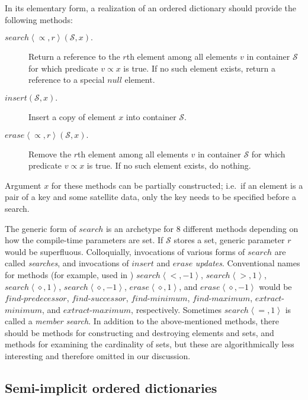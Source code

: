 \documentclass{DIKU-article}
\newcommand{\Search}{\mbox{$\mathit{search}$}}
\newcommand{\sequence}[1]{\left\langle#1\right\rangle}
\newcommand{\Erase}{\mbox{$\mathit{erase}$}}
\newcommand{\Findmin}{\mbox{$\mathit{find}$\textnormal{-}}\allowbreak{}\mbox{$\mathit{minimum}$}}
\newcommand{\Findmax}{\mbox{$\mathit{find}$\textnormal{-}}\allowbreak{}\mbox{$\mathit{maximum}$}}
\newcommand{\Predecessor}{\mbox{$\mathit{find}$\textnormal{-}}\allowbreak{}\mbox{$\mathit{predecessor}$}}
\newcommand{\Successor}{\mbox{$\mathit{find}$\textnormal{-}}\allowbreak{}\mbox{$\mathit{successor}$}}
\newcommand{\Insert}{\mbox{$\mathit{insert}$}}
\newcommand{\Extractmin}{\mbox{$\mathit{extract}$\textnormal{-}$\mathit{minimum}$}}
\newcommand{\Extractmax}{\mbox{$\mathit{extract}$\textnormal{-}$\mathit{maximum}$}}
\newcommand{\Null}{\mbox{$\mathit{null}$}}
\begin{document}
In its elementary form, a realization of an ordered dictionary should
provide the following methods:
\begin{description}

\item[$\Search\sequence{\propto,\mathit{r}}(\mathcal{S}, x).$] Return
a reference to the $r$th element among all elements $v$ in container
$\mathcal{S}$ for which predicate $v \propto x$ is true.  If no such
element exists, return a reference to a special \Null{} element.

\item[$\Insert{}(\mathcal{S}, x).$] Insert a copy of element $x$ into container $\mathcal{S}$.

\item[$\Erase\sequence{\propto,\mathit{r}}(\mathcal{S}, x).$] Remove
the $r$th element among all elements $v$ in container $\mathcal{S}$
for which predicate $v \propto x$ is true.  If no such element exists,
do nothing.
\end{description}
Argument $x$ for these methods can be
partially constructed; i.e.~if an element is a pair of a key and some
satellite data, only the key needs to be specified before a search.

The generic form of \Search{} is an archetype for 8 different methods
depending on how the compile-time parameters are set. If $\mathcal{S}$
stores a set, generic parameter $r$ would be superfluous.
Colloquially, invocations of various forms of \Search{} are called
\emph{searches}, and invocations of \Insert{} and
\Erase{} \emph{updates}. 
Conventional
names for methods (for example, used in \cite{CLRS01})  
$\Search\sequence{<,-1}$,
$\Search\sequence{>,1}$,
$\Search\sequence{\diamond,1}$, 
$\Search\sequence{\diamond,-1}$,
$\Erase\sequence{\diamond,1}$, and
$\Erase\sequence{\diamond,-1}$
would be 
\Predecessor{}, 
\Successor{}, 
\Findmin{}, 
\Findmax{},
\Extractmin{}, and
\Extractmax{},
respectively.
Sometimes $\Search\sequence{=,1}$ is called a \emph{member search}.
In addition to the above-mentioned methods, there should be methods
for constructing and destroying elements and sets, and methods for
examining the cardinality of sets, but these are algorithmically less
interesting and therefore omitted in our discussion.

\subsection*{Semi-implicit ordered dictionaries}
\end{document}

